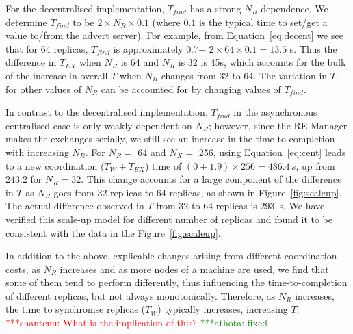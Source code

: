 \documentclass{rspublic}
\newcommand{\jhanote}[1]{ {\textcolor{red} { ***shantenu: #1 }}}
\newcommand{\alnote}[1]{ {\textcolor{blue} { ***andre: #1 }}}
\newcommand{\athotanote}[1]{ {\textcolor{green} { ***athota: #1 }}}
\newcommand{\alnote}[1]{}
\newcommand{\athotanote}[1]{}
\newcommand{\jhanote}[1]{}
\begin{document}
For the decentralised implementation, $T_{find}$ has a strong $N_R$
dependence. We determine $T_{find}$ to be $2 \times N_R \times 0.1$
(where $0.1$ is the typical time to set/get a value to/from the advert
server).  For example, from Equation~\ref{eq:decent} we see that for
64 replicas, $T_{find}$ is approximately $0.7$+ $2 \times 64 \times
0.1 = 13.5$ s.  Thus the difference in $T_{EX}$ when $N_R$ is 64
and $N_R$ is 32 is 45s, which accounts for the bulk of the increase in
overall $T$ when $N_R$ changes from 32 to
64. %
The variation in $T$ for other values of $N_R$ can be
accounted for by changing values of $T_{find}$.



In contrast to the decentralised implementation, $T_{find}$ in the
asynchronous centralised case is only weakly dependent on $N_R$; however,
since the RE-Manager makes the exchanges serially, we still see an
increase in the time-to-completion with increasing $N_R$. %
For $N_R =$ 64 and $N_X=$ 256, using Equation~\ref{eq:cent} leads to a
new coordination ($T_W + T_{EX}$) time of $(0+1.9) \times 256 =
486.4\,s$, up from $243.2$ for $N_R = 32$. This change accounts for a
large component of the difference in $T$ as $N_R$ goes from 32
replicas to 64 replicas, as shown in Figure~\ref{fig:scaleup}. The
actual difference observed in $T$ from 32 to 64 replicas is 293~s. We
have verified this scale-up model for different number of replicas and
found it to be consistent with the data in the
Figure~\ref{fig:scaleup}.

In addition to the above, explicable changes arising from different
coordination costs, as $N_R$ increases and as more nodes of a machine
are used, we find that some of them tend to perform differently, thus
influencing the time-to-completion of different replicas, but not
always monotonically. Therefore, as $N_R$ increases, the time to synchronise replicas ($T_W$)
typically increases, increasing $T$. \jhanote{What is the implication of this?} \athotanote{fixed}
\end{document}
